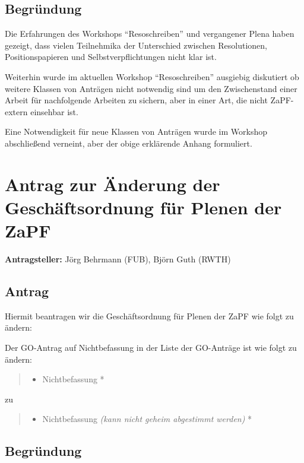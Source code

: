 \documentclass[draft,10pt,oneside]{scrartcl}
\begin{document}
\subsection*{Begründung}

Die Erfahrungen des Workshops ``Resoschreiben'' und vergangener Plena haben
gezeigt, dass vielen Teilnehmika der Unterschied zwischen Resolutionen,
Positionspapieren und Selbstverpflichtungen nicht klar ist.

Weiterhin wurde im aktuellen Workshop ``Resoschreiben'' ausgiebig diskutiert ob
weitere Klassen von Anträgen nicht notwendig sind um den Zwischenstand einer
Arbeit für nachfolgende Arbeiten zu sichern, aber in einer Art, die nicht
ZaPF-extern einsehbar ist.

Eine Notwendigkeit für neue Klassen von Anträgen wurde im Workshop abschließend
verneint, aber der obige erklärende Anhang formuliert.

\newpage

\section*{Antrag zur Änderung der Geschäftsordnung für Plenen der ZaPF}

\textbf{Antragsteller:} Jörg Behrmann (FUB), Björn Guth (RWTH)

\subsection*{Antrag}

Hiermit beantragen wir die Geschäftsordnung für Plenen der ZaPF wie folgt zu
ändern:

Der GO-Antrag auf Nichtbefassung in der Liste der GO-Anträge ist wie folgt zu
ändern:
\begin{quote}
  \begin{itemize}
  \item Nichtbefassung *
  \end{itemize}
\end{quote}
zu
\begin{quote}
  \begin{itemize}
  \item Nichtbefassung \emph{(kann nicht geheim abgestimmt werden)} *
  \end{itemize}
\end{quote}

\subsection*{Begründung}
\end{document}

